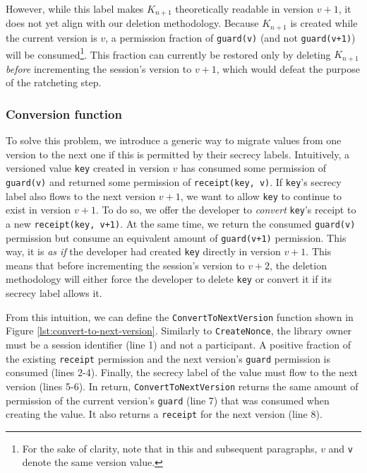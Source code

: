 However, while this label makes $K_{n+1}$ theoretically readable in version $v+1$, it does not yet align with our deletion methodology. Because $K_{n+1}$ is created while the current version is $v$, a permission fraction of \texttt{guard(v)} (and not \texttt{guard(v+1)}) will be consumed\footnote{For the sake of clarity, note that in this and subsequent paragraphs, $v$ and \texttt{v} denote the same version value.}. This fraction can currently be restored only by deleting $K_{n+1}$ \emph{before} incrementing the session's version to $v+1$, which would defeat the purpose of the ratcheting step.

\subsubsection{Conversion function}
\label{sec:conversion-function}

To solve this problem, we introduce a generic way to migrate values from one version to the next one if this is permitted by their secrecy labels.
Intuitively, a versioned value \texttt{key} created in version $v$ has consumed some permission of \texttt{guard(v)} and returned some permission of \texttt{receipt(key, v)}.
If \texttt{key}'s secrecy label also flows to the next version $v+1$, we want to allow \texttt{key} to continue to exist in version $v+1$.
To do so, we offer the developer to \emph{convert} \texttt{key}'s receipt to a new \texttt{receipt(key, v+1)}. At the same time, we return the consumed \texttt{guard(v)} permission but consume an equivalent amount of \texttt{guard(v+1)} permission.
This way, it is \emph{as if} the developer had created \texttt{key} directly in version $v+1$.
This means that before incrementing the session's version to $v+2$, the deletion methodology will either force the developer to delete \texttt{key} or convert it if its secrecy label allows it.

From this intuition, we can define the \texttt{ConvertToNextVersion} function shown in Figure \ref{lst:convert-to-next-version}.
Similarly to \texttt{CreateNonce}, the library owner must be a session identifier (line 1) and not a participant. A positive fraction of the existing \texttt{receipt} permission and the next version's \texttt{guard} permission is consumed (lines 2-4). Finally, the secrecy label of the value must flow to the next version (lines 5-6).
In return, \texttt{ConvertToNextVersion} returns the same amount of permission of the current version's \texttt{guard} (line 7) that was consumed when creating the value. It also returns a \texttt{receipt} for the next version (line 8).

